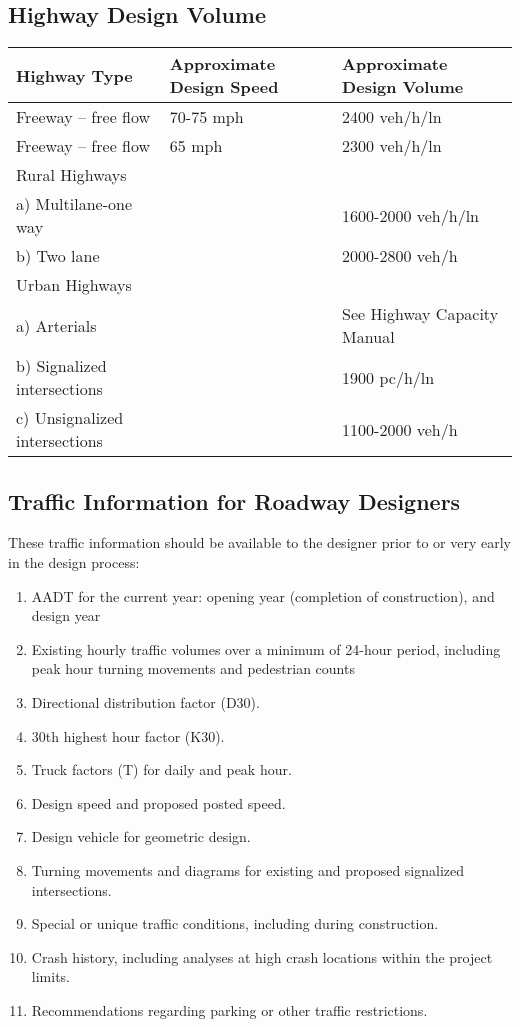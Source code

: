 \documentclass{article}
\begin{document}
  \subsection{Highway Design Volume}
  \begin{tabular}{|l|l|l|}
  \hline
  Highway Type & Approximate Design Speed & Approximate Design Volume \\
  \hline
  Freeway – free flow & 70-75 mph & 2400 veh/h/ln \\
  Freeway – free flow & 65 mph & 2300 veh/h/ln \\
  \hline
  Rural Highways & & \\
  a) Multilane-one way & & 1600-2000 veh/h/ln \\
  b) Two lane & & 2000-2800 veh/h \\
  \hline
  Urban Highways & & \\
  a) Arterials & & See Highway Capacity Manual \\
  b) Signalized intersections & & 1900 pc/h/ln \\
  c) Unsignalized intersections & & 1100-2000 veh/h \\
  \hline
  \end{tabular}

  \subsection{Traffic Information for Roadway Designers}
  These traffic information should be available to the designer prior to or very early in the design process:
  \begin{enumerate}
    \item AADT for the current year: opening year (completion of construction), and design year
    \item Existing hourly traffic volumes over a minimum of 24-hour period, including peak hour turning movements and pedestrian counts
    \item Directional distribution factor (D30).
    \item 30th highest hour factor (K30).
    \item Truck factors (T) for daily and peak hour.
    \item Design speed and proposed posted speed.
    \item Design vehicle for geometric design.
    \item Turning movements and diagrams for existing and proposed signalized intersections.
    \item Special or unique traffic conditions, including during construction.
    \item Crash history, including analyses at high crash locations within the project limits.
    \item Recommendations regarding parking or other traffic restrictions.
  \end{enumerate}
\end{document}
